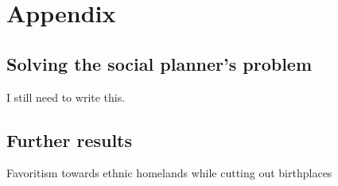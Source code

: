 \documentclass[11pt, oneside]{article}   	%
\begin{document}
  \section*{Appendix}

  \subsection{Solving the social planner's problem}
  \label{chapter:APP:math}
  I still need to write this.


  \subsection{Further results}

  \begin{table}[h] \centering
    \caption{Favoritism towards ethnic homelands while cutting out birthplaces}
    \label{tab:APP:favoritism_sans}
    \resizebox{\textwidth}{!}{


}
\end{table}
\end{document}
